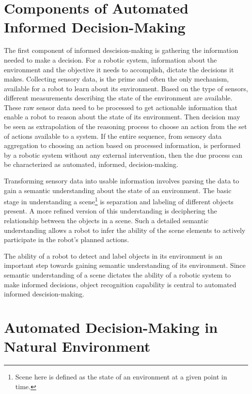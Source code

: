 \section{Components of Automated Informed Decision-Making}

The first component of informed descision-making is gathering the information needed to make a decision. 
For a robotic system,
information about the environment and the objective it needs to accomplish, dictate the decisions it makes. 
Collecting sensory data, is the prime 
and often the only mechanism, available for a robot to learn about its environment. Based on the 
type of sensors, different measurements describing the state of the environment are available. 
These raw sensor data need to be processed to get actionable information that enable a robot to reason about the state of its environment. 
Then decision may be seen as extrapolation of the reasoning process to choose an action from the set of actions available to a system.
If the entire sequence, from sensory data aggregation to choosing an action based on processed information, is performed by
a robotic system without any external intervention, then the due process can be characterized as automated, informed, decision-making. 

Transforming sensory data into usable information involves parsing the data to gain a semantic understanding about the state of an environment.
The basic stage in understanding a scene\footnote{Scene here is defined as the state of an environment at a given point in time.} is separation and labeling of different objects present.
A more refined version of this understanding is deciphering the relationship between the objects in a scene.
Such a detailed semantic understanding allows a robot to infer the ability of the scene elements 
to actively participate in the robot's planned actions.

The ability of a robot to detect and label objects in its environment is an important step towards gaining semantic understanding of its environment.
Since semantic understanding of a scene dictates the ability of a robotic system to make informed decisions, object recognition capability
is central to automated informed descision-making.

\section{Automated Decision-Making in Natural Environment}

